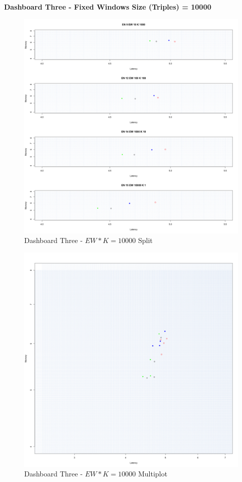 \textbf{Dashboard Three - Fixed Windows Size (Triples) = 10000 } 


\begin{figure}[tbh]
	\centering
	\includegraphics[width=0.90\linewidth]{images/dashboard-3-split}	
	\caption{Dashboard Three - $EW*K=10000$ Split} 
	\label{fig:result_dashboard_proba}
\end{figure}
\begin{figure}[tbh]
	\centering
	\includegraphics[width=0.90\linewidth]{images/dashboard-3}	
	\caption{Dashboard Three - $EW*K=10000$ Multiplot} 
	\label{fig:result_dashboard_probb}
\end{figure}

